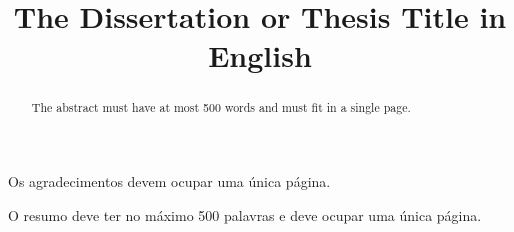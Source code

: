 \documentclass[Ingles, hidelinks]{ic-tese-v3} %
\begin{document}
\title{The Dissertation or Thesis Title in English}

{} %

\mestrado %




\paginasiniciais



Os agradecimentos devem ocupar uma única página.

\begin{resumo}
O resumo deve ter no máximo 500 palavras e deve ocupar uma única página.
\end{resumo}

\begin{abstract}
The abstract must have at most 500 words and must fit in a single page.
\end{abstract}

\listoffigures
\listoftables

\tableofcontents

\fimdaspaginasiniciais









\end{document}
